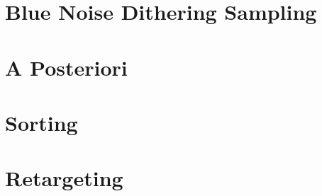 \section{Blue Noise Dithering Sampling}
\label{ch:Content1:sec:blue noise sampling}


\section{A Posteriori}
\label{ch:Content2:sec:a Posteriori}




\section{Sorting}
\label{ch:Content2:sec:Sorting}




\section{Retargeting}
\label{ch:Content2:sec:Retargeting}




